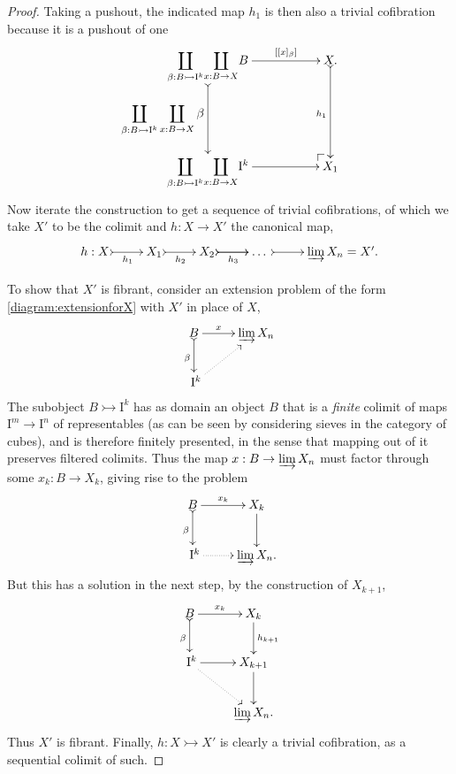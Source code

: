 \documentclass[11pt]{article}
\makeatletter
\newcommand{\pocorner}[1][dr]{\save*!/#1+1.2pc/#1:(1,-1)@^{|-}\restore}
\newcommand{\mono}{\ensuremath{\rightarrowtail}}
\newcommand{\ra}{\ensuremath{\rightarrow}}
\newcommand{\I}{\ensuremath{\mathrm{I}}}
\theoremstyle{remark}
\theoremstyle{definition}
\makeatother
\begin{document}
\begin{proof}
Taking a pushout, the indicated map $h_1$ is then also a trivial cofibration because it is a pushout of one
\begin{equation*}%
\xymatrix{
{\displaystyle\coprod_{\beta: B\mono\I^k}} {{\displaystyle\coprod_{x: B\ra X}} B} {\ar@{>->}[dd]_-{{\displaystyle\coprod_{\beta: B\mono\I^k}} \displaystyle\coprod_{x: B\ra X}\beta}} {\ar[rr]^-{[[x]_\beta]}} && X \ar@{>->}[dd]_{h_1}.\\
&&\\
{\displaystyle\coprod_{\beta: B\mono\I^k}} {{\displaystyle\coprod_{x: B\ra X}} \I^{k}}{\ar[rr]} && {\pocorner} X_1
}
\end{equation*}
Now iterate the construction to get a sequence of trivial cofibrations, of which we take $X'$ to be the colimit and $h :X\to X'$ the canonical map,
\begin{equation*}%
\xymatrix{
h:X \ar@{>->}[r]_-{h_1} & X_1 \ar@{>->}[r]_-{h_2} & X_2 \ar@{>->}[r]_-{h_3} \ar@{>->}[r] & \dots\ \ar@{>->}[r] & {\varinjlim X_n} = X'.
}
\end{equation*}

To show that $X'$ is fibrant, consider an extension problem of the form \eqref{diagram:extensionforX} with $X'$ in place of $X$,
\begin{equation*}%
\xymatrix{
B \ar@{>->}[d]_{\beta} \ar[r]^-x & {\varinjlim X_n}\\
\ \I^{k} \ar@{..>}[ru]&
}
\end{equation*}
The subobject $B\mono \I^k$ has as domain an object $B$ that is a \emph{finite} colimit of maps $\I^m \ra \I^n$ of representables (as can be seen by considering sieves in the category of cubes), and is therefore finitely presented, in the sense that mapping out of it preserves filtered colimits.  Thus the map $x: B \to {\varinjlim X_n}$ must factor through some $x_k: B \to X_k$, giving rise to the problem
\begin{equation*}%
\xymatrix{
B \ar@{>->}[d]_{\beta} \ar[r]^-{x_k}  & X_k \ar[d] \\
\ \I^{k} \ar@{..>}[r] &  {\varinjlim X_n}.
}
\end{equation*}
But this has a solution in the next step, by the construction of $X_{k+1}$,
\begin{equation*}%
\xymatrix{
B \ar@{>->}[d]_{\beta} \ar[r]^-{x_k} & X_k \ar[d]^{h_{k+1}} \\
\ \I^{k} \ar[r]  \ar@{..>}[rd] &  X_{k+1}\ar[d]\\
& {\varinjlim X_n}.
}
\end{equation*}
Thus $X'$ is fibrant.  Finally, $h : X\mono X'$ is clearly a trivial cofibration, as a sequential colimit of such. 
\end{proof}
\end{document}
